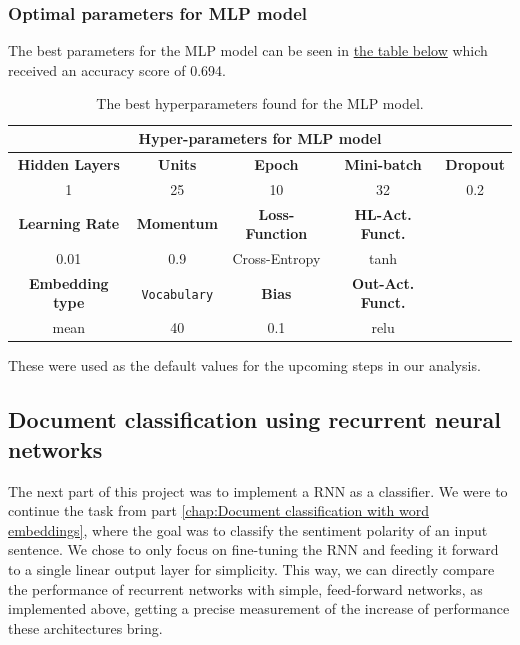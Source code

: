   

\subsubsection{Optimal parameters for MLP model}
The best parameters for the MLP model can be seen in \href{table:optimal_params}{the table below} which received an accuracy score of 0.694.
\begin{table}[H]
    \centering
    \begin{tabular}{ |c|c|c|c|c| }
        \hline
        \multicolumn{5}{|c|}{\textbf{Hyper-parameters for MLP model}} \\
        \hline
        \textbf{Hidden Layers} & \textbf{Units} & \textbf{Epoch} & \textbf{Mini-batch} & \textbf{Dropout} \\
        \hline
        1 & 25 & 10 & 32 & 0.2 \\
        \hline
         \textbf{Learning Rate} & \textbf{Momentum} & \textbf{Loss-Function} & \textbf{HL-Act. Funct.} &\\
        \hline
        0.01 & 0.9 & Cross-Entropy & tanh & \\
        \hline
         \textbf{Embedding type} & \texttt{Vocabulary} & \textbf{Bias} & \textbf{Out-Act. Funct.} &\\
         \hline
         mean & 40 & 0.1 & relu &\\
        \hline
    \end{tabular}
    \caption{The best hyperparameters found for the MLP model.}
    \label{table:optimal_params}
\end{table}

These were used as the default values for the upcoming steps in our analysis.

\subsection{Document classification using recurrent neural networks}
\label{chap:Document classification using recurrent neural networks}

\quad The next part of this project was to implement a RNN as a classifier. We were to continue the task from part \ref{chap:Document classification with word embeddings}, where the goal was to classify the sentiment polarity of an input sentence. We chose to only focus on fine-tuning the RNN and feeding it forward to a single linear output layer for simplicity. This way, we can directly compare the performance of recurrent networks with simple, feed-forward networks, as implemented above, getting a precise measurement of the increase of performance these architectures bring. 

